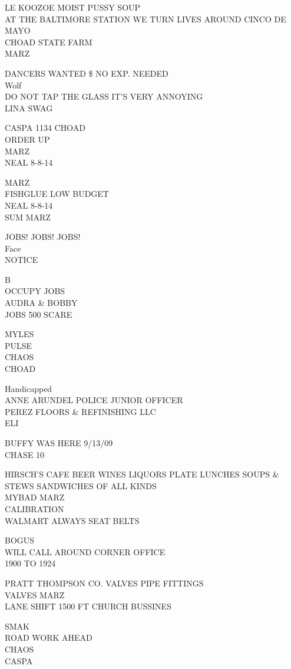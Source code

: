 \documentclass[10pt,letterpaper]{article}
\begin{document}
LE KOOZOE MOIST PUSSY SOUP\\
AT THE BALTIMORE STATION WE TURN LIVES AROUND CINCO DE MAYO\\
CHOAD STATE FARM\\
MARZ

DANCERS WANTED \$ NO EXP. NEEDED\\
Wolf\\
DO NOT TAP THE GLASS IT'S VERY ANNOYING\\
LINA SWAG

CASPA 1134 CHOAD\\
ORDER UP\\
MARZ\\
NEAL 8{-}8{-}14

MARZ\\
FISHGLUE LOW BUDGET\\
NEAL 8{-}8{-}14\\
SUM MARZ

JOBS!  JOBS!  JOBS!\\
Face\\
NOTICE

B\\
OCCUPY JOBS\\
AUDRA \& BOBBY\\
JOBS 500 SCARE

MYLES\\
PULSE\\
CHAOS\\
CHOAD

Handicapped\\
ANNE ARUNDEL POLICE JUNIOR OFFICER\\
PEREZ FLOORS \& REFINISHING LLC\\
ELI

BUFFY WAS HERE 9/13/09\\
CHASE 10

HIRSCH'S CAFE BEER WINES LIQUORS PLATE LUNCHES SOUPS \& STEWS SANDWICHES OF ALL KINDS\\
MYBAD MARZ\\
CALIBRATION\\
WALMART ALWAYS SEAT BELTS

BOGUS\\
WILL CALL AROUND CORNER OFFICE\\
1900 TO 1924

PRATT THOMPSON CO. VALVES PIPE FITTINGS\\
VALVES MARZ\\
LANE SHIFT 1500 FT CHURCH BUSSINES

SMAK\\
ROAD WORK AHEAD\\
CHAOS\\
CASPA
\end{document}
